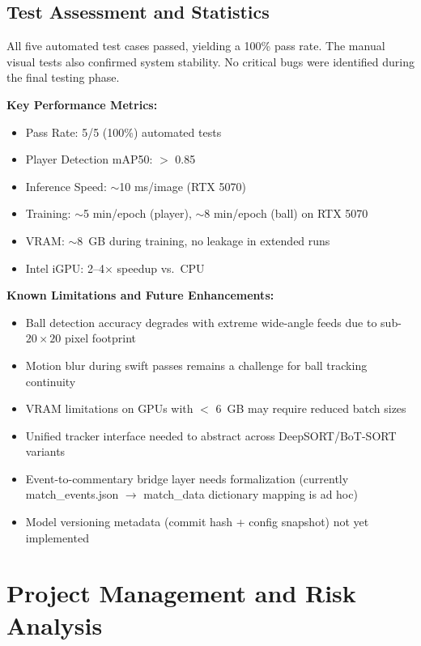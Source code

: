 \documentclass[10pt,twocolumn,a4paper]{article}
\begin{document}
\subsection{Test Assessment and Statistics}

All five automated test cases passed, yielding a 100\% pass rate. The manual visual tests also confirmed system stability. No critical bugs were identified during the final testing phase.

\textbf{Key Performance Metrics:}
\begin{itemize}[noitemsep,topsep=0pt]
  \item Pass Rate: 5/5 (100\%) automated tests
  \item Player Detection mAP50: $>$ 0.85
  \item Inference Speed: $\sim$10 ms/image (RTX 5070)
  \item Training: $\sim$5 min/epoch (player), $\sim$8 min/epoch (ball) on RTX 5070
  \item VRAM: $\sim$8~GB during training, no leakage in extended runs
  \item Intel iGPU: 2--4$\times$ speedup vs.\ CPU
\end{itemize}

\textbf{Known Limitations and Future Enhancements:}
\begin{itemize}[noitemsep,topsep=0pt]
  \item Ball detection accuracy degrades with extreme wide-angle feeds due to sub-$20\times20$ pixel footprint
  \item Motion blur during swift passes remains a challenge for ball tracking continuity
  \item VRAM limitations on GPUs with $<$ 6~GB may require reduced batch sizes
  \item Unified tracker interface needed to abstract across DeepSORT/BoT-SORT variants
  \item Event-to-commentary bridge layer needs formalization (currently match\_events.json $\rightarrow$ match\_data dictionary mapping is ad hoc)
  \item Model versioning metadata (commit hash + config snapshot) not yet implemented
\end{itemize}

\section{Project Management and Risk Analysis}
\end{document}
